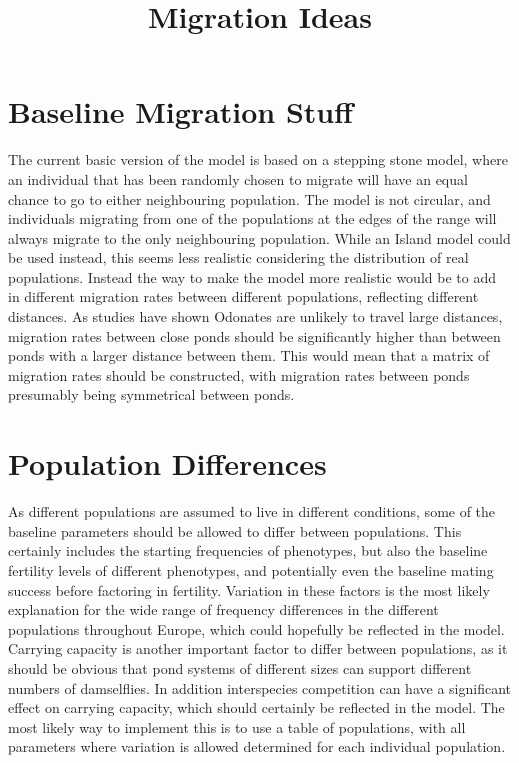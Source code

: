 \documentclass{article}
\title{Migration Ideas}
\date{\vspace{-5ex}}
\begin{document}
\maketitle

\section{Baseline Migration Stuff}
The current basic version of the model is based on a stepping stone model, where an individual that has been randomly chosen to migrate will have an equal chance to go to either neighbouring population. The model is not circular, and individuals migrating from one of the populations at the edges of the range will always migrate to the only neighbouring population. While an Island model could be used instead, this seems less realistic considering the distribution of real populations. Instead the way to make the model more realistic would be to add in different migration rates between different populations, reflecting different distances. As studies have shown Odonates are unlikely to travel large distances, migration rates between close ponds should be significantly higher than between ponds with a larger distance between them. This would mean that a matrix of migration rates should be constructed, with migration rates between ponds presumably being symmetrical between ponds.

\section{Population Differences}
As different populations are assumed to live in different conditions, some of the baseline parameters should be allowed to differ between populations. This certainly includes the starting frequencies of phenotypes, but also the baseline fertility levels of different phenotypes, and potentially even the baseline mating success before factoring in fertility. Variation in these factors is the most likely explanation for the wide range of frequency differences in the different populations throughout Europe, which could hopefully be reflected in the model. Carrying capacity is another important factor to differ between populations, as it should be obvious that pond systems of different sizes can support different numbers of damselflies. In addition interspecies competition can have a significant effect on carrying capacity, which should certainly be reflected in the model. The most likely way to implement this is to use a table of populations, with all parameters where variation is allowed determined for each individual population.
\end{document}
